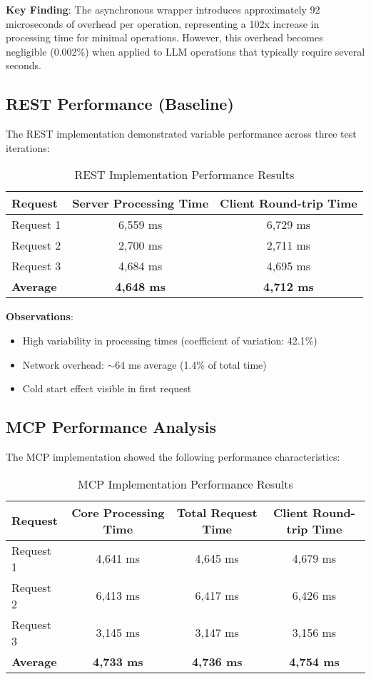 \textbf{Key Finding}: The asynchronous wrapper introduces approximately 92 microseconds of overhead per operation, representing a 102x increase in processing time for minimal operations. However, this overhead becomes negligible (0.002\%) when applied to LLM operations that typically require several seconds.

\subsection{REST Performance (Baseline)}

The REST implementation demonstrated variable performance across three test iterations:

\begin{table}[h]
\centering
\caption{REST Implementation Performance Results}
\begin{tabular}{|l|c|c|}
\hline
\textbf{Request} & \textbf{Server Processing Time} & \textbf{Client Round-trip Time} \\
\hline
Request 1 & 6,559 ms & 6,729 ms \\
\hline
Request 2 & 2,700 ms & 2,711 ms \\
\hline
Request 3 & 4,684 ms & 4,695 ms \\
\hline
\textbf{Average} & \textbf{4,648 ms} & \textbf{4,712 ms} \\
\hline
\end{tabular}
\end{table}

\textbf{Observations}:
\begin{itemize}
    \item High variability in processing times (coefficient of variation: 42.1\%)
    \item Network overhead: $\sim$64 ms average (1.4\% of total time)
    \item Cold start effect visible in first request
\end{itemize}

\subsection{MCP Performance Analysis}

The MCP implementation showed the following performance characteristics:

\begin{table}[h]
\centering
\caption{MCP Implementation Performance Results}
\begin{tabular}{|l|c|c|c|}
\hline
\textbf{Request} & \textbf{Core Processing Time} & \textbf{Total Request Time} & \textbf{Client Round-trip Time} \\
\hline
Request 1 & 4,641 ms & 4,645 ms & 4,679 ms \\
\hline
Request 2 & 6,413 ms & 6,417 ms & 6,426 ms \\
\hline
Request 3 & 3,145 ms & 3,147 ms & 3,156 ms \\
\hline
\textbf{Average} & \textbf{4,733 ms} & \textbf{4,736 ms} & \textbf{4,754 ms} \\
\hline
\end{tabular}
\end{table}

